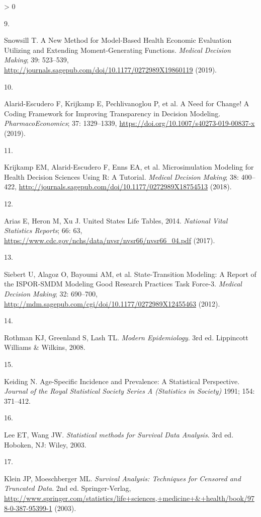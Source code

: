 \documentclass[
]{article}
\newlength{\cslhangindent}
\newlength{\csllabelwidth}
\newenvironment{CSLReferences}[2] %
 {%
  \setlength{\parindent}{0pt}
  \ifodd #1 \everypar{\setlength{\hangindent}{\cslhangindent}}\ignorespaces\fi
  \ifnum #2 > 0
  \setlength{\parskip}{#2\baselineskip}
  \fi
 }%
 {}
\newcommand{\CSLLeftMargin}[1]{\parbox[t]{\csllabelwidth}{#1}}
\newcommand{\CSLRightInline}[1]{\parbox[t]{\linewidth - \csllabelwidth}{#1}\break}
\begin{document}
\begin{CSLReferences}{0}{0}
\leavevmode\hypertarget{ref-Snowsill2019}{}%
\CSLLeftMargin{9. }
\CSLRightInline{Snowsill T. {A New Method for Model-Based Health Economic Evaluation Utilizing and Extending Moment-Generating Functions}. \emph{Medical Decision Making}; 39: 523--539, \url{http://journals.sagepub.com/doi/10.1177/0272989X19860119} (2019).}

\leavevmode\hypertarget{ref-Alarid-Escudero2019e}{}%
\CSLLeftMargin{10. }
\CSLRightInline{Alarid-Escudero F, Krijkamp E, Pechlivanoglou P, et al. {A Need for Change! A Coding Framework for Improving Transparency in Decision Modeling}. \emph{PharmacoEconomics}; 37: 1329--1339, \url{https://doi.org/10.1007/s40273-019-00837-x} (2019).}

\leavevmode\hypertarget{ref-Krijkamp2018}{}%
\CSLLeftMargin{11. }
\CSLRightInline{Krijkamp EM, Alarid-Escudero F, Enns EA, et al. {Microsimulation Modeling for Health Decision Sciences Using R: A Tutorial}. \emph{Medical Decision Making}; 38: 400--422, \url{http://journals.sagepub.com/doi/10.1177/0272989X18754513} (2018).}

\leavevmode\hypertarget{ref-Arias2017}{}%
\CSLLeftMargin{12. }
\CSLRightInline{Arias E, Heron M, Xu J. {United States Life Tables, 2014}. \emph{National Vital Statistics Reports}; 66: 63, \url{https://www.cdc.gov/nchs/data/nvsr/nvsr66/nvsr66_04.pdf} (2017).}

\leavevmode\hypertarget{ref-Siebert2012c}{}%
\CSLLeftMargin{13. }
\CSLRightInline{Siebert U, Alagoz O, Bayoumi AM, et al. {State-Transition Modeling: A Report of the ISPOR-SMDM Modeling Good Research Practices Task Force-3}. \emph{Medical Decision Making}; 32: 690--700, \url{http://mdm.sagepub.com/cgi/doi/10.1177/0272989X12455463} (2012).}

\leavevmode\hypertarget{ref-Rothman2008h}{}%
\CSLLeftMargin{14. }
\CSLRightInline{Rothman KJ, Greenland S, Lash TL. \emph{{Modern Epidemiology}}. 3rd ed. Lippincott Williams {\&} Wilkins, 2008.}

\leavevmode\hypertarget{ref-Keiding1991}{}%
\CSLLeftMargin{15. }
\CSLRightInline{Keiding N. {Age-Specific Incidence and Prevalence: A Statistical Perspective}. \emph{Journal of the Royal Statistical Society Series A (Statistics in Society)} 1991; 154: 371--412.}

\leavevmode\hypertarget{ref-Lee2003a}{}%
\CSLLeftMargin{16. }
\CSLRightInline{Lee ET, Wang JW. \emph{{Statistical methods for Survival Data Analysis}}. 3rd ed. Hoboken, NJ: Wiley, 2003.}

\leavevmode\hypertarget{ref-Klein2003}{}%
\CSLLeftMargin{17. }
\CSLRightInline{Klein JP, Moeschberger ML. \emph{{Survival Analysis: Techniques for Censored and Truncated Data}}. 2nd ed. Springer-Verlag, \url{http://www.springer.com/statistics/life+sciences,+medicine+\&+health/book/978-0-387-95399-1} (2003).}


\end{CSLReferences}
\end{document}
